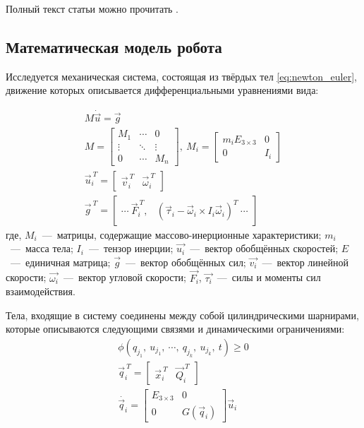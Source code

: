 Полный текст статьи можно прочитать \cite{bulichevOptimizationCentipedeRobot2017}.

\subsection{Математическая модель робота}
Исследуется механическая система, состоящая из твёрдых тел \eqref{eq:newton_euler}, движение которых описывается дифференциальными уравнениями вида:

\begin{align}
    \label{eq:newton_euler}
    M \dot{\vec{u}} = \vec{g} \\
    M = \begin{bmatrix}
    M_1 & \cdots  & 0 \\
    \vdots  & \ddots  & \vdots  \\ 
    0 & \cdots   & M_n 
    \end{bmatrix},\ M_i = \begin{bmatrix}
    m_i E_{3\times 3} & 0 \\ 
    0 & I_i 
    \end{bmatrix} \\
    \vec{u}_i^{\ T} = \begin{bmatrix}
        \vec{v}_i^{\ T} & \vec{\omega}_i^{\ T}
    \end{bmatrix} \\ 
    \vec{g}^{\ T} = \begin{bmatrix}
        \cdots \  \vec{F}_i^{\ T}, & (\vec{\tau}_i - \vec{\omega}_i \times I_i \vec{\omega}_i)^T\  \cdots 
    \end{bmatrix}
\end{align}
где, $M_i$~---~матрицы, содержащие массово-инерционные характеристики; $m_i$~---~масса тела; $I_i$~---~тензор инерции; $\vec{u_i}$~---~вектор обобщённых скоростей; $E$~---~единичная матрица; $\vec{g}$~---~вектор обобщённых сил; $\vec{v_i}$~---~вектор линейной скорости; $\vec{\omega_i}$~---~вектор угловой скорости; $\vec{F_i}$, $\vec{\tau_i}$~---~силы и моменты сил взаимодействия.

Тела, входящие в систему соединены между собой цилиндрическими шарнирами, которые описываются следующими связями и динамическими ограничениями:
\begin{align}
    \label{eq:kin_constr}
    \phi(q_{j_1},\ u_{j_1},\ \cdots,\ q_{j_k},\ u_{j_k},\ t) \geqslant  0 \\
    \vec{q}_i^{\ T} = \begin{bmatrix}
        \vec{x}_i^{\ T} & \vec{Q}_i^{\ T}
    \end{bmatrix} \\
    \dot{\vec{q}_i} = \begin{bmatrix}
    E_{3\times3} & 0\\ 
    0 & G(\vec{q}_i) 
    \end{bmatrix}\vec{u}_i  
\end{align}

